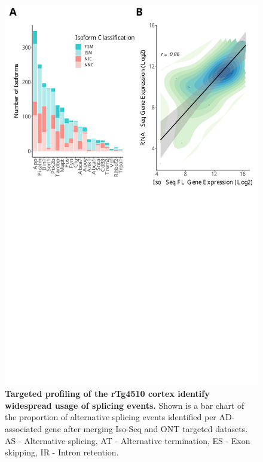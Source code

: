 \begin{figure}[]
	\centering
	\includegraphics[page=9,trim={0 26cm 0 0cm},clip,scale = 0.55]{Figures/ONTvsIsoSeq.pdf}
	\captionsetup{width=0.95\textwidth}
	\caption[Merged splicing landscape from Iso-Seq and ONT targeted profiling]%
	{\textbf{Targeted profiling of the rTg4510 cortex identify widespread usage of splicing events.} Shown is a bar chart of the proportion of alternative splicing events identified per AD-associated gene after merging Iso-Seq and ONT targeted datasets. AS - Alternative splicing, AT - Alternative termination, ES - Exon skipping, IR - Intron retention.}
	\label{fig:AS_targeted}
\end{figure}

